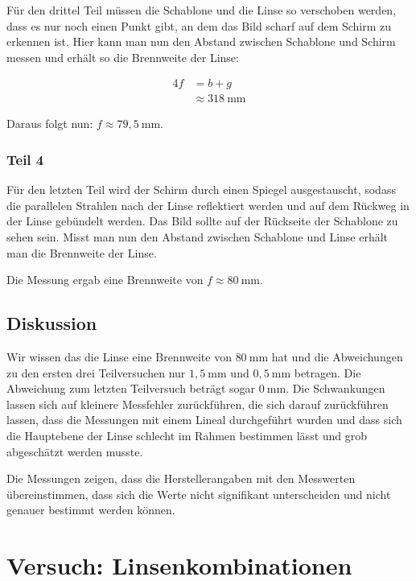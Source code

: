         Für den drittel Teil müssen die Schablone und die Linse so verschoben werden, dass es nur noch einen Punkt gibt, an dem das Bild scharf auf dem Schirm zu erkennen ist. Hier kann man nun den Abstand zwischen Schablone und Schirm messen und erhält so die Brennweite der Linse:

        $$
        \begin{aligned}
            4f &= b + g\\
            &\approx 318\ \mathrm{mm}
        \end{aligned}
        $$

        Daraus folgt nun: $f \approx 79,5\ \mathrm{mm}$.

    \subsubsection{Teil 4}
    
        Für den letzten Teil wird der Schirm durch einen Spiegel ausgestauscht, sodass die parallelen Strahlen nach der Linse reflektiert werden und auf dem Rückweg in der Linse gebündelt werden. Das Bild sollte auf der Rückseite der Schablone zu sehen sein. Misst man nun den Abstand zwischen Schablone und Linse erhält man die Brennweite der Linse.

        Die Messung ergab eine Brennweite von $f \approx 80\ \mathrm{mm}$.

    \subsection{Diskussion}

        Wir wissen das die Linse eine Brennweite von $80\ \mathrm{mm}$ hat und die Abweichungen zu den ersten drei Teilversuchen nur $1,5\ \mathrm{mm}$ und $0,5\ \mathrm{mm}$ betragen. Die Abweichung zum letzten Teilversuch beträgt sogar $0\ \mathrm{mm}$. Die Schwankungen lassen sich auf kleinere Messfehler zurückführen, die sich darauf zurückführen lassen, dass die Messungen mit einem Lineal durchgeführt wurden und dass sich die Hauptebene der Linse schlecht im Rahmen bestimmen lässt und grob abgeschätzt werden musste.

        Die Messungen zeigen, dass die Herstellerangaben mit den Messwerten übereinstimmen, dass sich die Werte nicht signifikant unterscheiden und nicht genauer bestimmt werden können.

\newpage

\section{Versuch: Linsenkombinationen}

